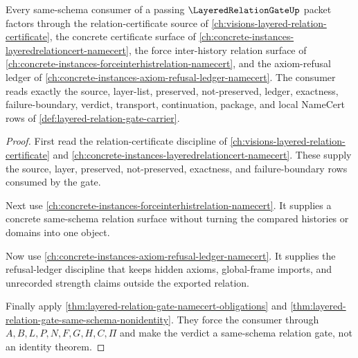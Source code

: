 \begin{theorem}
\label{thm:layered-relation-gate-consumer-route}
Every same-schema consumer of a passing $\LayeredRelationGateUp$ packet factors through the relation-certificate source of \autoref{ch:visions-layered-relation-certificate}, the concrete certificate surface of \autoref{ch:concrete-instances-layeredrelationcert-namecert}, the force inter-history relation surface of \autoref{ch:concrete-instances-forceinterhistrelation-namecert}, and the axiom-refusal ledger of \autoref{ch:concrete-instances-axiom-refusal-ledger-namecert}. The consumer reads exactly the source, layer-list, preserved, not-preserved, ledger, exactness, failure-boundary, verdict, transport, continuation, package, and local NameCert rows of \autoref{def:layered-relation-gate-carrier}.
\end{theorem}
\begin{proof}
First read the relation-certificate discipline of \autoref{ch:visions-layered-relation-certificate} and \autoref{ch:concrete-instances-layeredrelationcert-namecert}. These supply the source, layer, preserved, not-preserved, exactness, and failure-boundary rows consumed by the gate.

Next use \autoref{ch:concrete-instances-forceinterhistrelation-namecert}. It supplies a concrete same-schema relation surface without turning the compared histories or domains into one object.

Now use \autoref{ch:concrete-instances-axiom-refusal-ledger-namecert}. It supplies the refusal-ledger discipline that keeps hidden axioms, global-frame imports, and unrecorded strength claims outside the exported relation.

Finally apply \autoref{thm:layered-relation-gate-namecert-obligations} and \autoref{thm:layered-relation-gate-same-schema-nonidentity}. They force the consumer through $A,B,L,P,N,F,G,H,C,\Pi$ and make the verdict a same-schema relation gate, not an identity theorem.
\end{proof}

